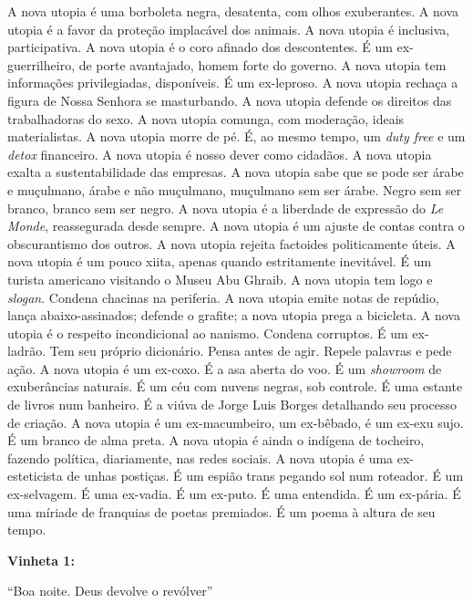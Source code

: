 A nova utopia é uma borboleta negra, desatenta, com olhos exuberantes. A
nova utopia é a favor da proteção implacável dos animais. A nova utopia
é inclusiva, participativa. A nova utopia é o coro afinado dos
descontentes. É um ex-guerrilheiro, de porte avantajado, homem forte do
governo. A nova utopia tem informações privilegiadas, disponíveis. É um
ex-leproso. A nova utopia rechaça a figura de Nossa Senhora se
masturbando. A nova utopia defende os direitos das trabalhadoras do
sexo. A nova utopia comunga, com moderação, ideais materialistas. A nova
utopia morre de pé. É, ao mesmo tempo, um \emph{duty free} e um
\emph{detox} financeiro. A nova utopia é nosso dever como cidadãos. A
nova utopia exalta a sustentabilidade das empresas. A nova utopia sabe
que se pode ser árabe e muçulmano, árabe e não muçulmano, muçulmano sem
ser árabe. Negro sem ser branco, branco sem ser negro. A nova utopia é a
liberdade de expressão do \emph{Le Monde}, reassegurada desde sempre. A
nova utopia é um ajuste de contas contra o obscurantismo dos outros. A
nova utopia rejeita factoides politicamente úteis. A nova utopia é um
pouco xiita, apenas quando estritamente inevitável. É um turista
americano visitando o Museu Abu Ghraib. A nova utopia tem logo e
\emph{slogan}. Condena chacinas na periferia. A nova utopia emite notas
de repúdio, lança abaixo-assinados; defende o grafite; a nova utopia
prega a bicicleta. A nova utopia é o respeito incondicional ao nanismo.
Condena corruptos. É um ex-ladrão. Tem seu próprio dicionário. Pensa
antes de agir. Repele palavras e pede ação. A nova utopia é um ex-coxo.
É a asa aberta do voo. É um \emph{showroom} de exuberâncias naturais. É
um céu com nuvens negras, sob controle. É uma estante de livros num
banheiro. É a viúva de Jorge Luis Borges detalhando seu processo de
criação. A nova utopia é um ex-macumbeiro, um ex-bêbado, é um ex-exu
sujo. É um branco de alma preta. A nova utopia é ainda o indígena de
tocheiro, fazendo política, diariamente, nas redes sociais. A nova
utopia é uma ex-esteticista de unhas postiças. É um espião trans pegando
sol num roteador. É um ex-selvagem. É uma ex-vadia. É um ex-puto. É uma
entendida. É um ex-pária. É uma míriade de franquias de poetas
premiados. É um poema à altura de seu tempo.

\pagebreak

\textbf{Vinheta 1:}

``Boa noite. Deus devolve o revólver''


